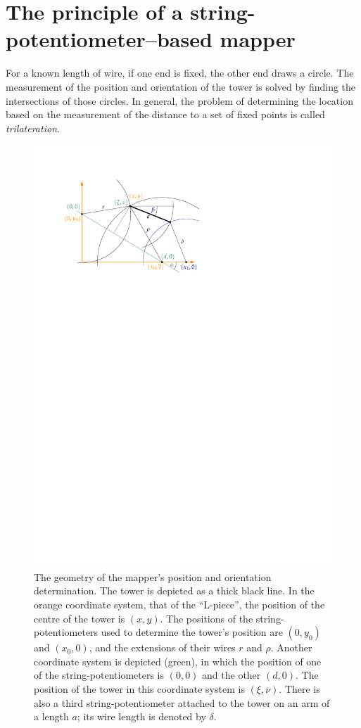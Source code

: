 \section{The principle of a string-potentiometer--based mapper}
For a known length of wire, if one end is fixed, the other end draws a circle.
The measurement of the position and orientation of the tower is solved by finding the intersections of those circles.
In general, the problem of determining the location based on the measurement of the distance to a set of fixed points is called \emph{trilateration}.

\begin{figure}
  \centering
  \includegraphics[width=0.7\linewidth]{gfx/mapping/geometry.pdf}
  \caption{The geometry of the mapper's position and orientation determination.
  The tower is depicted as a thick black line.
  In the orange coordinate system, that of the ``L-piece'', the position of the centre of the tower is $(x,y)$.
  The positions of the string-potentiometers used to determine the tower's position are $(0, y_0)$ and $(x_0, 0)$, and the extensions of their wires $r$ and $\rho$.
  Another coordinate system is depicted (green), in which the position of one of the string-potentiometers is $(0,0)$ and the other $(d, 0)$.
  The position of the tower in this coordinate system is $(\xi, \nu)$.
  There is also a third string-potentiometer attached to the tower on an arm of a length $a$; its wire length is denoted by $\delta$.}\label{fig:mapping_geometry}
\end{figure}

